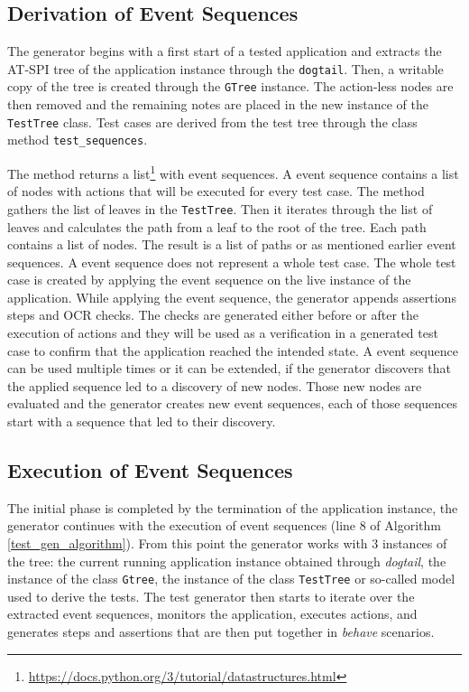 \subsection{Derivation of Event Sequences}

The generator begins with a first start of a tested application and extracts the AT-SPI tree of the application instance through the \texttt{dogtail}. Then, a writable copy of the tree is created through the \texttt{GTree} instance. The action-less nodes are then removed and the remaining notes are placed in the new instance of the \texttt{TestTree} class. Test cases are derived from the test tree through the class method \texttt{test\_sequences}. 

The method returns a list\footnote{\url{https://docs.python.org/3/tutorial/datastructures.html}} with event sequences. A event sequence contains a list of nodes with actions that will be executed for every test case. The method gathers the list of leaves in the \texttt{TestTree}. Then it iterates through the list of leaves and calculates the path from a leaf to the root of the tree. Each path contains a list of nodes. The result is a list of paths or as mentioned earlier event sequences. A event sequence does not represent a whole test case. The whole test case is created by applying the event sequence on the live instance of the application. While applying the event sequence, the generator appends assertions steps and OCR checks. The checks are generated either before or after the execution of actions and they will be used as a verification in a generated test case to confirm that the application reached the intended state. A event sequence can be used multiple times or it can be extended, if the generator discovers that the applied sequence led to a discovery of new nodes. Those new nodes are evaluated and the generator creates new event sequences, each of those sequences start with a sequence that led to their discovery. 

\subsection{Execution of Event Sequences}
The initial phase is completed by the termination of the application instance, the generator continues with the execution of event sequences (line 8 of Algorithm \ref{test_gen_algorithm}). From this point the generator works with 3 instances of the tree: the current running application instance obtained through \textit{dogtail}, the instance of the class \texttt{Gtree}, the instance of the class \texttt{TestTree} or so-called model used to derive the tests.
The test generator then starts to iterate over the extracted event sequences, monitors the application, executes actions, and generates steps and assertions that are then put together in \textit{behave} scenarios. 

